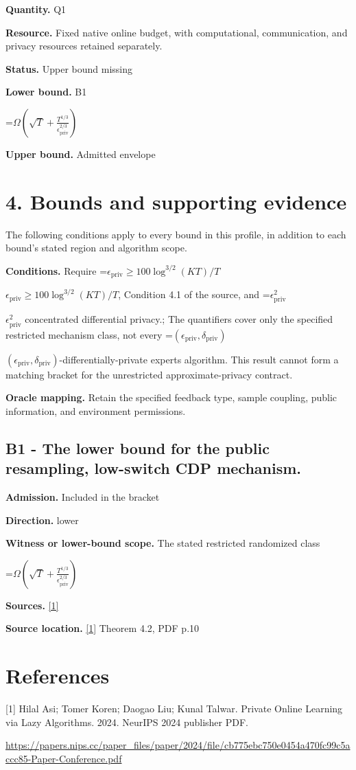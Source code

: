 \documentclass[10pt,a4paper]{article}
\newcommand{\AtlasMath}[1]{\par\begingroup\centering\setbox0=\hbox{$\displaystyle #1$}\ifdim\wd0>1.4\linewidth\typeout{ATLAS WIDE FORMULA: \the\wd0}\fi\ifdim\wd0>\linewidth\resizebox{\linewidth}{!}{\box0}\else\box0\fi\par\endgroup}
\newcommand{\AtlasInlineMath}[1]{\begingroup\setbox0=\hbox{$#1$}\ifdim\wd0>.4\linewidth\endgroup\AtlasMath{#1}\else\endgroup$#1$\fi}
\begin{document}
\textbf{Quantity.} Q1

\textbf{Resource.} Fixed native online budget, with computational, communication, and privacy resources retained separately.

\textbf{Status.} Upper bound missing

\textbf{Lower bound.} B1

\AtlasMath{\Omega\!\left(\sqrt T+\frac{T^{1/3}}{\epsilon_{\mathrm{priv}}^{2/3}}\right)}
\textbf{Upper bound.} Admitted envelope

\section{4. Bounds and supporting evidence}
The following conditions apply to every bound in this profile, in addition to each bound's stated region and algorithm scope.

\textbf{Conditions.} Require \AtlasInlineMath{\epsilon_{\mathrm{priv}}\ge100\log^{3/2}(KT)/T}, Condition 4.1 of the source, and \AtlasInlineMath{\epsilon_{\mathrm{priv}}^2} concentrated differential privacy.; The quantifiers cover only the specified restricted mechanism class, not every \AtlasInlineMath{(\epsilon_{\mathrm{priv}},\delta_{\mathrm{priv}})}-differentially-private experts algorithm. This result cannot form a matching bracket for the unrestricted approximate-privacy contract.

\textbf{Oracle mapping.} Retain the specified feedback type, sample coupling, public information, and environment permissions.

\subsection{B1 - The lower bound for the public resampling, low-switch CDP mechanism.}
\textbf{Admission.} Included in the bracket

\textbf{Direction.} lower

\textbf{Witness or lower-bound scope.} The stated restricted randomized class

\AtlasMath{\Omega\!\left(\sqrt T+\frac{T^{1/3}}{\epsilon_{\mathrm{priv}}^{2/3}}\right)}
\textbf{Sources.} \href{https://papers.nips.cc/paper_files/paper/2024/file/cb775ebc750e0454a470fc99c5accc85-Paper-Conference.pdf}{[1]}

\textbf{Source location.} \href{https://papers.nips.cc/paper_files/paper/2024/file/cb775ebc750e0454a470fc99c5accc85-Paper-Conference.pdf}{[1]} Theorem 4.2, PDF p.10

\section{References}
[1] Hilal Asi; Tomer Koren; Daogao Liu; Kunal Talwar. Private Online Learning via Lazy Algorithms. 2024. NeurIPS 2024 publisher PDF.

\url{https://papers.nips.cc/paper_files/paper/2024/file/cb775ebc750e0454a470fc99c5accc85-Paper-Conference.pdf}
\end{document}
